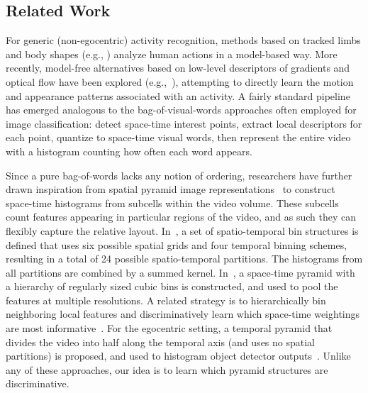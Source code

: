 
\subsection{Related Work}


For generic (non-egocentric) activity recognition, methods based on tracked limbs and body shapes (e.g., \cite{Ramanan03, Rao01, Rodriguez08}) analyze human actions in a model-based way.  More recently, model-free alternatives based on low-level descriptors of gradients and optical flow have been explored (e.g.,~\cite{Schuldt04,Laptev08,Marszalek09}), attempting to directly learn the motion and appearance patterns associated with an activity.  A fairly standard pipeline has emerged analogous to the bag-of-visual-words approaches often employed for image classification: detect space-time interest points, extract local descriptors for each point, quantize to space-time visual words, then represent the entire video with a histogram counting how often each word appears.


Since a pure bag-of-words lacks any notion of ordering, researchers have further drawn inspiration from spatial pyramid image representations~\cite{Lazebnik06,Bosch07} to construct space-time histograms from subcells within the video volume.  These subcells count features appearing in particular regions of the video, and as such they can flexibly capture the relative layout.  In~\cite{Laptev08}, a set of spatio-temporal bin structures is defined that uses six possible spatial grids and four temporal binning schemes, resulting in a total of 24 possible spatio-temporal partitions.  The histograms from all partitions are combined by a summed kernel.  In~\cite{Choi08}, a space-time pyramid with a hierarchy of regularly sized cubic bins is constructed, and used to pool the features at multiple resolutions.   A related strategy is to hierarchically bin neighboring local features and discriminatively learn which space-time weightings are most informative~\cite{Kovashka10}.  For the egocentric setting, a temporal pyramid that divides the video into half along the temporal axis (and uses no spatial partitions) is proposed, and used to histogram object detector outputs~\cite{Ramanan12}.  Unlike any of these approaches, our idea is to learn which pyramid structures are discriminative.


